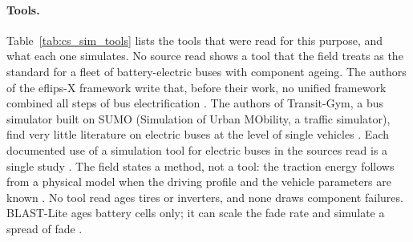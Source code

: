\documentclass[11pt,a4paper]{article}
\theoremstyle{plain}
\theoremstyle{definition}
\theoremstyle{remark}
\begin{document}
\paragraph{Tools.}
Table~\ref{tab:cs_sim_tools} lists the tools that were read for this purpose, and what each one simulates.
No source read shows a tool that the field treats as the standard for a fleet of battery-electric buses with component ageing.
The authors of the eflips-X framework write that, before their work, no unified framework combined all steps of bus electrification \cite[Sect.~1]{Heide2025}.
The authors of Transit-Gym, a bus simulator built on SUMO (Simulation of Urban MObility, a traffic simulator), find very little literature on electric buses at the level of single vehicles \cite[Sect.~II.D]{Sun2021}.
Each documented use of a simulation tool for electric buses in the sources read is a single study \cite{Heide2025,Konzept2025,Sun2021}.
The field states a method, not a tool: the traction energy follows from a physical model when the driving profile and the vehicle parameters are known \cite[Sect.~1.4.1]{Heide2025}.
No tool read ages tires or inverters, and none draws component failures.
BLAST-Lite ages battery cells only; it can scale the fade rate and simulate a spread of fade \cite{BLASTLite}.
\end{document}
